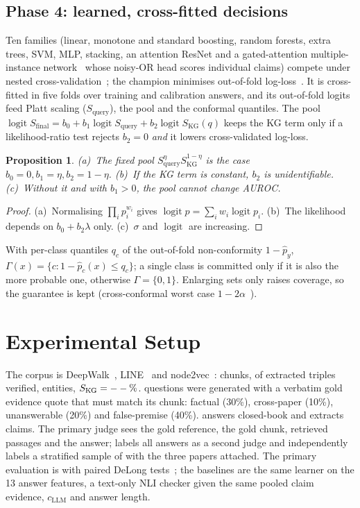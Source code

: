 \documentclass[conference]{IEEEtran}
\newtheorem{proposition}{Proposition}
\DeclareMathOperator{\logit}{logit}
\newcommand{\SKGq}{S_{\mathrm{KG}}(q)}
\begin{document}
\subsection{Phase 4: learned, cross-fitted decisions}
Ten families (linear, monotone and standard boosting, random forests, extra trees, SVM, MLP, stacking, an attention
ResNet and a gated-attention multiple-instance network~\cite{ilse2018attention} whose noisy-OR head scores individual
claims) compete under nested cross-validation~\cite{cawley2010overfitting}; the champion minimises out-of-fold
log-loss~\cite{gneiting2007scoring}. It is cross-fitted in five folds over training and calibration answers, and its
out-of-fold logits feed Platt scaling ($S_{\mathrm{query}}$), the pool and the conformal quantiles. The pool
$\logit S_{\mathrm{final}}=b_0+b_1\logit S_{\mathrm{query}}+b_2\logit\SKGq$ keeps the KG term only if a likelihood-ratio
test rejects $b_2=0$ \emph{and} it lowers cross-validated log-loss.
\begin{proposition}\label{prop:pool}
(a)~The fixed pool $S_{\mathrm{query}}^{\eta}S_{\mathrm{KG}}^{1-\eta}$ is the case $b_0=0,b_1=\eta,b_2=1-\eta$. (b)~If the
KG term is constant, $b_2$ is unidentifiable. (c)~Without it and with $b_1>0$, the pool cannot change AUROC.
\end{proposition}
\begin{proof}
(a)~Normalising $\prod_ip_i^{w_i}$ gives $\logit p=\sum_iw_i\logit p_i$. (b)~The likelihood depends on $b_0+b_2\lambda$
only. (c)~$\sigma$ and $\logit$ are increasing.
\end{proof}
With per-class quantiles $q_c$ of the out-of-fold non-conformity $1-\hat p_y$, $\Gamma(x)=\{c:1-\hat p_c(x)\le q_c\}$; a
single class is committed only if it is also the more probable one, otherwise $\Gamma=\{0,1\}$. Enlarging sets only
raises coverage, so the guarantee is kept (cross-conformal worst case $1-2\alpha$~\cite{vovk2015cross,barber2021jackknife}).

\section{Experimental Setup}
The corpus is DeepWalk~\cite{perozzi2014deepwalk}, LINE~\cite{tang2015line} and node2vec~\cite{grover2016node2vec}:
\NChunks{} chunks, \NTriples{} of \NRawTriples{} extracted triples verified, \NEntities{} entities, $S_{\mathrm{KG}}=--\%$.
\NItems{} questions were generated with a verbatim gold evidence quote that must match its chunk: factual (30\%),
cross-paper (10\%), unanswerable (20\%) and false-premise (40\%). \texttt{\AnswerModel} answers closed-book and extracts
claims. The primary judge \texttt{\JudgeModel} sees the gold reference, the gold chunk, retrieved passages and the answer;
\texttt{\CrossJudge} labels all answers as a second judge and \GeminiName{} independently labels a stratified sample of
\CrossJudgeN{} with the three papers attached. The primary evaluation is \CVProtocol{} with paired DeLong
tests~\cite{delong1988comparing}; the baselines are the same learner on the 13 answer features, a text-only NLI checker
given the same pooled claim evidence, $c_{\mathrm{LLM}}$ and answer length.
\end{document}
